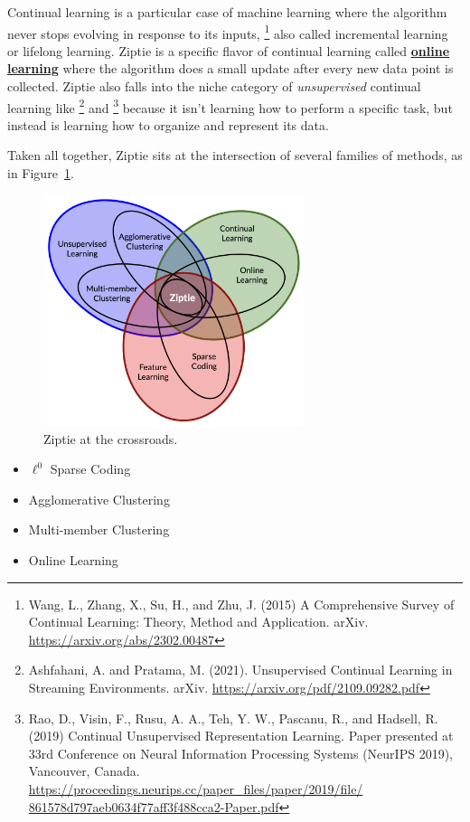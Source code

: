 Continual learning is a particular case of machine learning where the
algorithm never stops evolving in response to its inputs,
\footnote{Wang, L., Zhang, X., Su, H., and Zhu, J. (2015)
A Comprehensive Survey of Continual Learning: Theory, Method and Application.
arXiv.
\href{https://arxiv.org/abs/2302.00487}{https://arxiv.org/abs/2302.00487}
}
also called incremental learning or lifelong learning.
Ziptie is a specific flavor of continual learning called
\textbf{\href{https://en.wikipedia.org/wiki/Online_machine_learning}{online learning}}
where the algorithm does a small update after every new data point is collected.
Ziptie also falls into the niche category of \textit{unsupervised}
continual learning like
\footnote{Ashfahani, A. and Pratama, M. (2021).
Unsupervised Continual Learning in Streaming Environments. arXiv.
\href{https://arxiv.org/pdf/2109.09282.pdf}{https://arxiv.org/pdf/2109.09282.pdf}
}
and
\footnote{Rao, D., Visin, F., Rusu, A. A., Teh, Y. W., Pascanu, R., and Hadsell, R.
(2019) Continual Unsupervised Representation Learning.
Paper presented at 33rd Conference on Neural Information Processing Systems
(NeurIPS 2019), Vancouver, Canada.
\href{https://proceedings.neurips.cc/paper_files/paper/2019/file/861578d797aeb0634f77aff3f488cca2-Paper.pdf}
{https://proceedings.neurips.cc/paper\_files/paper/2019/file/ 861578d797aeb0634f77aff3f488cca2-Paper.pdf}
}
because it isn't learning how to perform a specific task, but instead is
learning how to organize and represent its data. 


Taken all together, Ziptie sits at the intersection 
of several families of methods, as in Figure~\ref{fig:venn}.

\begin{figure}[ht]
\vskip 0.2in
\begin{center}
\centerline{\includegraphics[width=3.0in]{images/ziptie_venn.png}}
\caption{Ziptie at the crossroads.}
\label{fig:venn}
\end{center}
\vskip -0.2in
\end{figure}

\begin{itemize}
\item{$\ell^0$ Sparse Coding}
\item{Agglomerative Clustering}
\item{Multi-member Clustering}
\item{Online Learning}
\end{itemize}
